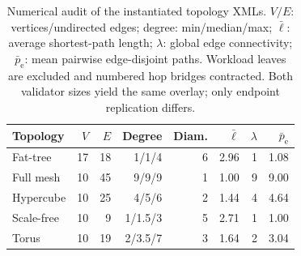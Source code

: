 \begin{table}[t]
\caption{Numerical audit of the instantiated topology XMLs. $V/E$: vertices/undirected edges; degree: min/median/max; $\bar{\ell}$: average shortest-path length; $\lambda$: global edge connectivity; $\bar{p}_{\mathrm{e}}$: mean pairwise edge-disjoint paths. Workload leaves are excluded and numbered hop bridges contracted. Both validator sizes yield the same overlay; only endpoint replication differs.}
\label{tab:topology_numeric_audit}
\centering
\TableFont
\setlength{\tabcolsep}{3.6pt}
\begin{tabular}{lrrrrrrr}
\toprule
Topology & $V$ & $E$ & Degree & Diam. & $\bar{\ell}$ & $\lambda$ & $\bar{p}_{\mathrm{e}}$ \\
\midrule
Fat-tree & 17 & 18 & 1/1/4 & 6 & 2.96 & 1 & 1.08 \\
Full mesh & 10 & 45 & 9/9/9 & 1 & 1.00 & 9 & 9.00 \\
Hypercube & 10 & 25 & 4/5/6 & 2 & 1.44 & 4 & 4.64 \\
Scale-free & 10 & 9 & 1/1.5/3 & 5 & 2.71 & 1 & 1.00 \\
Torus & 10 & 19 & 2/3.5/7 & 3 & 1.64 & 2 & 3.04 \\
\bottomrule
\end{tabular}
\end{table}
